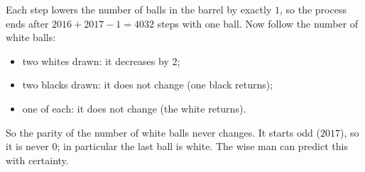 Each step lowers the number of balls in the barrel by exactly $1$, so the process ends after $2016+2017-1=4032$ steps with one ball. Now follow the number of white balls:
\begin{itemize}
\item two whites drawn: it decreases by $2$;
\item two blacks drawn: it does not change (one black returns);
\item one of each: it does not change (the white returns).
\end{itemize}
So the parity of the number of white balls never changes. It starts odd ($2017$), so it is never $0$; in particular the last ball is $\boxed{\text{white}}$. The wise man can predict this with certainty.
